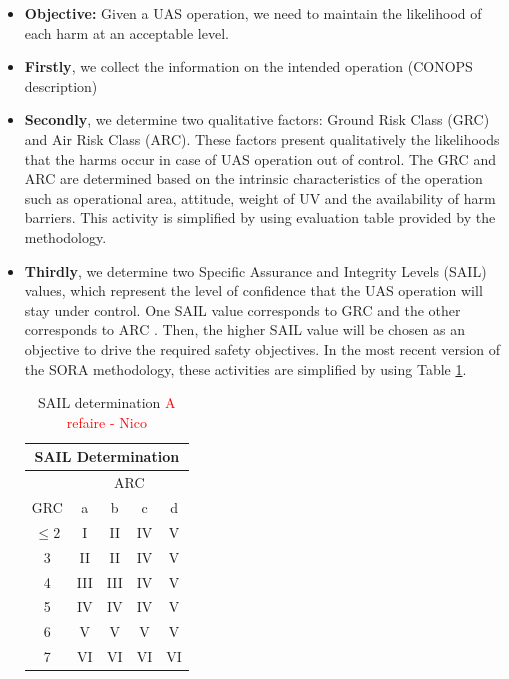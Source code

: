 \documentclass[a4paper, 10, conference]{ieeeconf}  %
\begin{document}
   \begin{itemize}
   	\item \textbf{Objective:} Given a UAS operation, we need to maintain the likelihood of each harm at an acceptable level. 
   	\item \textbf{Firstly}, we collect the information on the intended operation (CONOPS description)
   	\item \textbf{Secondly}, we determine two qualitative factors: Ground Risk Class (GRC) and Air Risk Class (ARC). These factors present qualitatively the likelihoods that the harms occur in case of UAS operation out of control. The GRC and ARC are determined based on the intrinsic characteristics of the operation such as operational area, attitude, weight of UV and the availability of harm barriers. This activity is simplified by using evaluation table provided by the methodology.   
   	  
   	\item \textbf{Thirdly}, we determine two Specific Assurance and Integrity Levels (SAIL) values, which represent the level of confidence that the UAS operation will stay under control. One SAIL value corresponds to GRC and the other corresponds to ARC \cite{SORAV1}. Then, the higher SAIL value will be chosen as an objective to drive the required safety objectives. In the most recent version of the SORA methodology, these activities are simplified by using Table \ref {tab:SAIL determination}.
   	
   	\begin{table}[!ht]
   		\centering
	   		\begin{tabular}{|c|c|c|c|c|}
	   			\hline
	   			\multicolumn{5}{|c|}{SAIL Determination} \\ \hline
	   			\rowcolor[HTML]{C0C0C0} 
	   			& \multicolumn{4}{c|}{\cellcolor[HTML]{C0C0C0}ARC} \\ \hline
	   			\rowcolor[HTML]{C0C0C0} 
	   			GRC & a & b & c & d \\ \hline
	   			\cellcolor[HTML]{C0C0C0}$\leq2$ & I & II & IV & V \\ \hline
	   			\cellcolor[HTML]{C0C0C0}3 & II & II & IV & V \\ \hline
	   			\cellcolor[HTML]{C0C0C0}4 & III & III & IV & V \\ \hline
	   			\cellcolor[HTML]{C0C0C0}5 & IV & IV & IV & V \\ \hline
	   			\cellcolor[HTML]{C0C0C0}6 & V & V & V & V \\ \hline
	   			\cellcolor[HTML]{C0C0C0}7 & VI & VI & VI & VI \\ \hline
	   		\end{tabular}
   		\caption{SAIL determination \cite{SORAV2} \textcolor{red}{A refaire - Nico}}
   		\label{tab:SAIL determination}
   	\end{table}
   

\end{itemize}
\end{document}
